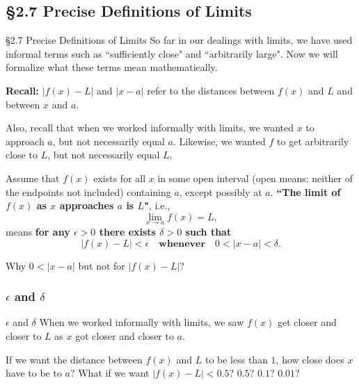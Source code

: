 \documentclass[cal1spr16Lectures.tex]{subfiles}
\begin{document}
\subsection[2.7 Precise Definitions of Limits]{\S 2.7 Precise Definitions of Limits}

\begin{frame}{\S 2.7 Precise Definitions of Limits}\small
So far in our dealings with limits, we have used informal terms such as ``sufficiently close" and ``arbitrarily large".  Now we will formalize what these terms mean mathematically.

\vspace{1pc}
\textbf{Recall:} $|f(x)-L|$ and $|x-a|$ refer to the distances between $f(x)$ and $L$ and between $x$ and $a$.

\vspace{1pc}
Also, recall that when we worked informally with limits, we wanted $x$ to approach $a$, \alert{but not necessarily equal $a$}.  Likewise, we wanted $f$ to get arbitrarily close to $L$, but not necessarily equal $L$.
\end{frame}

\begin{frame}\footnotesize
\begin{dfn}
Assume that $f(x)$ exists for all $x$ in some open interval (open means: neither of the endpoints not included) containing $a$, except possibly at $a$.  \textbf{``The limit of $f(x)$ as $x$ approaches $a$ is $L$"}, i.e.,
\[\lim_{x \to a}f(x)=L,\]
means \textbf{for any $\epsilon > 0$ there exists $\delta > 0$ such that} 
\[|f(x)-L|<\epsilon \quad \textbf{whenever} \quad 0<|x-a|<\delta.\]
\end{dfn}
\begin{que}
Why $0<|x-a|$ but not for $|f(x)-L|$?
\end{que}

\end{frame}

\subsubsection{$\epsilon$ and $\delta$}

\begin{frame}{\small $\epsilon$ and $\delta$}\small
When we worked informally with limits, we saw $f(x)$ get closer and closer to $L$ as $x$ got closer and closer to $a$. 

\begin{que} If we want the distance between $f(x)$ and $L$ to be less than $1$, how close does $x$ have to be to $a$? What if we want $|f(x)-L|<0.5$?  $0.5$? $0.1$? $0.01$?  
\end{que}
\end{frame}
\end{document}
